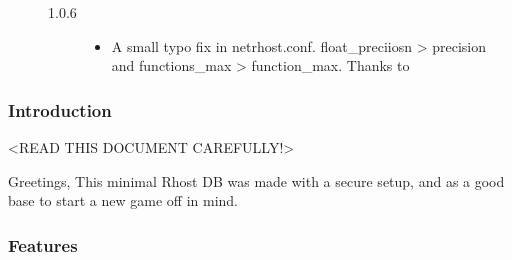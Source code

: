 \documentclass[letterpaper,10pt,english]{sphinxmanual}
\begin{document}
\begin{description}
\begin{description}
\begin{itemize}
\end{itemize}

\item[{1.0.6}] \leavevmode\begin{itemize}
\item {} 
\sphinxAtStartPar
A small typo fix in netrhost.conf. float\_preciiosn \sphinxhyphen{}\textgreater{} precision and
functions\_max \sphinxhyphen{}\textgreater{} function\_max. Thanks to 

\end{itemize}

\end{description}

\end{description}


\subsubsection{Introduction}
\label{\detokenize{gettingstarted:introduction}}
\sphinxAtStartPar
\textless{}READ THIS DOCUMENT CAREFULLY!\textgreater{}

\sphinxAtStartPar
Greetings,
This minimal Rhost DB was made with a secure setup, and as a good base to start
a new game off in mind.


\subsubsection{Features}
\label{\detokenize{gettingstarted:features}}
\end{document}
